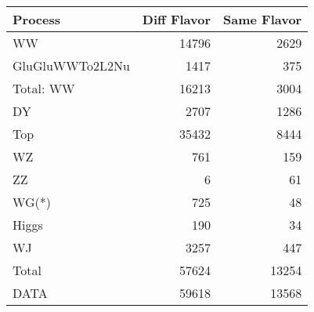 \begin{table}[ht]
	\centering
\begin{tabular}{lrr}

         Process &  Diff Flavor &  Same Flavor \\
		\hline
              WW &        14796 &         2629 \\
 GluGluWWTo2L2Nu &         1417 &          375 \\
\hline
       Total: WW &        16213 &         3004 \\
              DY &         2707 &         1286 \\
             Top &        35432 &         8444 \\
              WZ &          761 &          159 \\
              ZZ &            6 &           61 \\
           WG(*) &          725 &           48 \\
           Higgs &          190 &           34 \\
              WJ &         3257 &          447 \\
\hline
           Total &        57624 &        13254 \\
            DATA &        59618 &        13568 \\


\end{tabular}

\end{table}